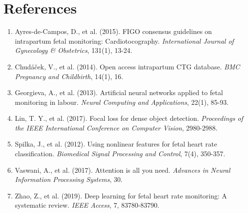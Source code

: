 \documentclass[12pt,a4paper]{article}
\begin{document}
\section{References}

\begin{enumerate}
    \item Ayres-de-Campos, D., et al. (2015). FIGO consensus guidelines on intrapartum fetal monitoring: Cardiotocography. \textit{International Journal of Gynecology \& Obstetrics}, 131(1), 13-24.

    \item Chudáček, V., et al. (2014). Open access intrapartum CTG database. \textit{BMC Pregnancy and Childbirth}, 14(1), 16.

    \item Georgieva, A., et al. (2013). Artificial neural networks applied to fetal monitoring in labour. \textit{Neural Computing and Applications}, 22(1), 85-93.

    \item Lin, T. Y., et al. (2017). Focal loss for dense object detection. \textit{Proceedings of the IEEE International Conference on Computer Vision}, 2980-2988.

    \item Spilka, J., et al. (2012). Using nonlinear features for fetal heart rate classification. \textit{Biomedical Signal Processing and Control}, 7(4), 350-357.

    \item Vaswani, A., et al. (2017). Attention is all you need. \textit{Advances in Neural Information Processing Systems}, 30.

    \item Zhao, Z., et al. (2019). Deep learning for fetal heart rate monitoring: A systematic review. \textit{IEEE Access}, 7, 83780-83790.
\end{enumerate}
\end{document}
